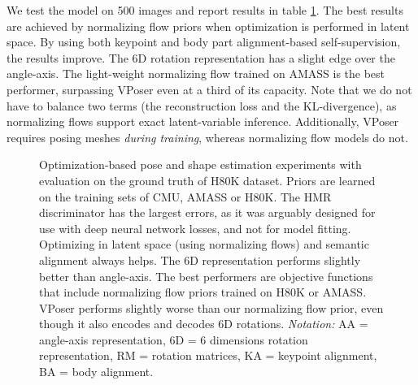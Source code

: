 \documentclass[runningheads]{llncs}
\begin{document}
We test the model on 500 images and report results in table \ref{tbl:fitting_experiment_h80k}. The best results are achieved by normalizing flow priors when optimization is performed in latent space. By using both keypoint and body part alignment-based self-supervision, the results improve. The 6D rotation representation has a slight edge over the angle-axis. The light-weight normalizing flow trained on AMASS is the best performer, surpassing VPoser even at a third of its capacity. Note that we do not have to balance two terms (the reconstruction loss and the KL-divergence), as normalizing flows support exact latent-variable inference. Additionally, VPoser requires posing meshes \emph{during training}, whereas normalizing flow models do not.
\begin{figure}
{
\caption{\small Optimization-based pose and shape estimation experiments with evaluation on the ground truth of H80K dataset. Priors are learned on the training sets of CMU, AMASS or H80K. The HMR discriminator has the largest errors, as it was arguably designed for use with deep neural network losses, and not for model fitting. Optimizing in latent space (using normalizing flows) and semantic alignment always helps. The 6D representation performs slightly better than angle-axis. The best performers are objective functions that include normalizing flow priors trained on H80K or AMASS. VPoser performs slightly worse than our normalizing flow prior, even though it also encodes and decodes 6D rotations. \textit{Notation:} AA = angle-axis representation, 6D = 6 dimensions rotation representation, RM = rotation matrices, KA = keypoint alignment, BA = body alignment.}
\label{tbl:fitting_experiment_h80k}
}
\end{figure}
\end{document}
